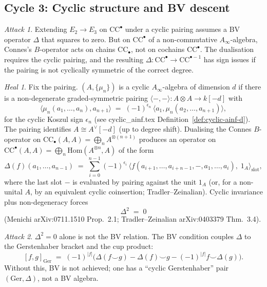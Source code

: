 \documentclass[11pt]{article}
\theoremstyle{definition}
\theoremstyle{remark}
\newtheorem*{attack}{Attack}
\newtheorem*{heal}{Heal}
\newcommand{\CC}{\mathrm{CC}}
\newcommand{\Ger}{\mathrm{Ger}}
\newcommand{\Ainf}{A_{\infty}}
\begin{document}
\subsection*{Cycle 3: Cyclic structure and BV descent}

\begin{attack}
Extending $E_2 \to E_3$ on $\CC^\bullet$ under a cyclic pairing
assumes a BV operator $\Delta$ that squares to zero. But on
$\CC^\bullet$ of a non-commutative $\Ainf$-algebra, Connes's
$B$-operator acts on chains $\CC_\bullet$, not on cochains
$\CC^\bullet$. The dualisation requires the cyclic pairing, and the
resulting $\Delta: \CC^\bullet \to \CC^{\bullet-1}$ has sign issues
if the pairing is not cyclically symmetric of the correct degree.
\end{attack}

\begin{heal}
Fix the pairing. $(A, \{\mu_n\})$ is a cyclic $\Ainf$-algebra of
dimension $d$ if there is a non-degenerate graded-symmetric pairing
$\langle-,-\rangle: A \otimes A \to k[-d]$ with
\[
 \langle \mu_n(a_1, \ldots, a_n), a_{n+1}\rangle
 \;=\; (-1)^{\epsilon_n}\,
 \langle a_1, \mu_n(a_2, \ldots, a_{n+1})\rangle,
\]
for the cyclic Koszul sign $\epsilon_n$ (see cyclic\_ainf.tex
Definition~\ref{def:cyclic-ainf-d}). The pairing identifies
$A \cong A^\vee[-d]$ (up to degree shift). Dualising the Connes
$B$-operator on $\CC_\bullet(A,A) = \bigoplus_n A^{\otimes (n+1)}$
produces an operator on $\CC^\bullet(A,A) =
\bigoplus_n \mathrm{Hom}(A^{\otimes n}, A)$ of the form
\[
 \Delta(f)(a_1, \ldots, a_{n-1}) \;=\;
 \sum_{i=0}^{n-1} (-1)^{\epsilon_i}\,
 \bigl\langle f(a_{i+1}, \ldots, a_{i+n-1}, -, a_1, \ldots, a_i),\; 1_A\bigr\rangle_{\mathrm{slot}},
\]
where the last slot $-$ is evaluated by pairing against the unit
$1_A$ (or, for a non-unital $A$, by an equivalent cyclic coinsertion;
Tradler--Zeinalian). Cyclic invariance plus non-degeneracy forces
\[
 \Delta^2 \;=\; 0
\]
(Menichi arXiv:0711.1510 Prop.~2.1; Tradler--Zeinalian
arXiv:0403379 Thm.~3.4).
\end{heal}

\begin{attack}
$\Delta^2 = 0$ alone is not the BV relation. The BV condition
couples $\Delta$ to the Gerstenhaber bracket and the cup product:
\[
 [f, g]_\Ger \;=\; (-1)^{|f|}\bigl(\Delta(f \smile g) - \Delta(f) \smile g - (-1)^{|f|} f \smile \Delta(g)\bigr).
\]
Without this, BV is not achieved; one has a ``cyclic Gerstenhaber''
pair $(\Ger, \Delta)$, not a BV algebra.
\end{attack}
\end{document}
